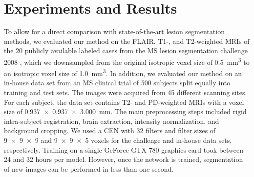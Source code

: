 \section{Experiments and Results}


To allow for a direct comparison with state-of-the-art lesion segmentation
methods, we evaluated our method on the FLAIR, T1-, and T2-weighted MRIs of the
20 publicly available labeled cases from the MS lesion segmentation challenge
2008 \cite{styner20083d}, which we downsampled from the original isotropic voxel
size of \SI{0.5}{\cubic\milli\metre} to an isotropic voxel
size of \SI{1.0}{\cubic\milli\metre}. In addition, we evaluated our method on an
in-house data set from an MS clinical trial of 500 subjects split equally into
training and test sets. The images were acquired from 45 different scanning
sites. For each subject, the data set contains T2- and PD-weighted MRIs with a
voxel size of \SI{0.937x0.937x3.000}{\milli\metre}. The main
preprocessing steps included rigid intra-subject registration, brain extraction,
intensity normalization, and background cropping.
%
%
We used a CEN with 32 filters and filter sizes of \num{9x9x9} and \num{9x9x5}
voxels for the challenge and in-house data sets, respectively. Training on a
single GeForce GTX 780 graphics card took between 24 and 32 hours per model.
However, once the network is trained, segmentation of new images can be
performed in less than one second.


